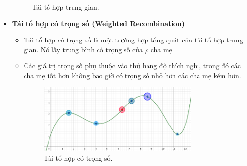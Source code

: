 \documentclass{book}
\begin{document}
\begin{itemize}
\begin{figure}[H]
        \caption{Tái tổ hợp trung gian.}
    \end{figure}
    \item \textbf{Tái tổ hợp có trọng số (Weighted Recombination)}
    \begin{itemize}
        \item Tái tổ hợp có trọng số là một trường hợp tổng quát của tái tổ hợp trung gian. Nó lấy trung bình có trọng số của $\rho$ cha mẹ.
        \item Các giá trị trọng số phụ thuộc vào thứ hạng độ thích nghi, trong đó các cha mẹ tốt hơn không bao giờ có trọng số nhỏ hơn các cha mẹ kém hơn.
        \begin{figure}[H]
            \centering
            \includegraphics[width=0.8\textwidth]{images/weighted_recombination.png}
            \caption{Tái tổ hợp có trọng số.}
        \end{figure}
    \end{itemize}
\end{itemize}
\end{document}
